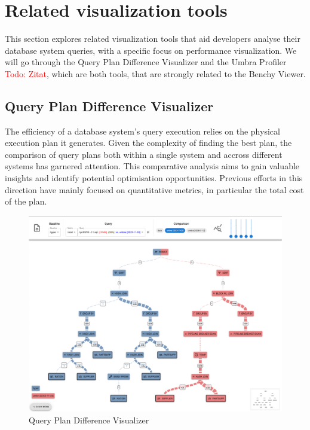 \section{Related visualization tools}

This section explores related visualization tools that aid developers analyse their database system queries, with a specific focus on performance visualization. We will go through the Query Plan Difference Visualizer and the Umbra Profiler \textcolor{red}{Todo: Zitat}, which are both tools, that are strongly related to the Benchy Viewer. 


\subsection{Query Plan Difference Visualizer}
\label{subsec:semantic-diff}

The efficiency of a database system's query execution relies on the physical execution plan it generates.  Given the complexity of finding the best plan, the comparison of query plans both within a single system and accross different systems has garnered attention. This comparative analysis aims to gain valuable insights and identify potential optimisation opportunities. Previous efforts in this direction have mainly focused on quantitative metrics, in particular the total cost of the plan.
\begin{figure}[h]
    \centering
    \includegraphics[width=0.8\linewidth]{figures/semantic-diff.png}
    \caption{Query Plan Difference Visualizer}
    \label{fig:semantic-diff}
  \end{figure}

